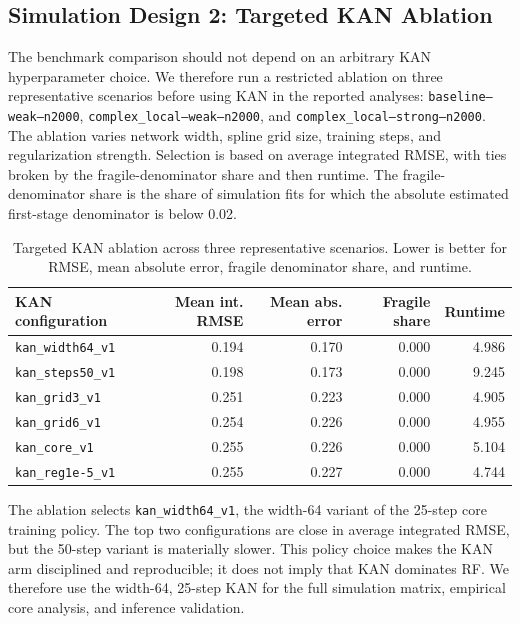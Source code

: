 \documentclass[final,3p,fleqn, 10pt]{elsarticle}
\begin{document}
\subsection{Simulation Design 2: Targeted KAN Ablation}
\label{subsec:sim_dgp2}

The benchmark comparison should not depend on an arbitrary KAN hyperparameter choice. We therefore run a restricted ablation on three representative scenarios before using KAN in the reported analyses: \texttt{baseline--weak--n2000}, \texttt{complex\_local--weak--n2000}, and \texttt{complex\_local--strong--n2000}. The ablation varies network width, spline grid size, training steps, and regularization strength. Selection is based on average integrated RMSE, with ties broken by the fragile-denominator share and then runtime. The fragile-denominator share is the share of simulation fits for which the absolute estimated first-stage denominator is below 0.02.

\begin{table}[htbp]
\centering
\caption{Targeted KAN ablation across three representative scenarios. Lower is better for RMSE, mean absolute error, fragile denominator share, and runtime.}
\label{tab:sim_results_summary_dgp2}
\small
\begin{tabular}{@{}lrrrr@{}}
\toprule
KAN configuration & Mean int. RMSE & Mean abs. error & Fragile share & Runtime \\
\midrule
\texttt{kan\_width64\_v1} & 0.194 & 0.170 & 0.000 & 4.986 \\
\texttt{kan\_steps50\_v1} & 0.198 & 0.173 & 0.000 & 9.245 \\
\texttt{kan\_grid3\_v1}   & 0.251 & 0.223 & 0.000 & 4.905 \\
\texttt{kan\_grid6\_v1}   & 0.254 & 0.226 & 0.000 & 4.955 \\
\texttt{kan\_core\_v1}    & 0.255 & 0.226 & 0.000 & 5.104 \\
\texttt{kan\_reg1e-5\_v1} & 0.255 & 0.227 & 0.000 & 4.744 \\
\bottomrule
\end{tabular}
\end{table}

The ablation selects \texttt{kan\_width64\_v1}, the width-64 variant of the 25-step core training policy. The top two configurations are close in average integrated RMSE, but the 50-step variant is materially slower. This policy choice makes the KAN arm disciplined and reproducible; it does not imply that KAN dominates RF. We therefore use the width-64, 25-step KAN for the full simulation matrix, empirical core analysis, and inference validation.
\end{document}
